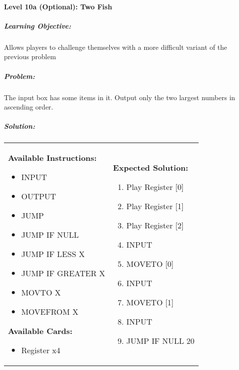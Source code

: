 \paragraph{Level 10a (Optional): Two Fish}
\subparagraph{Learning Objective:} Allows players to challenge themselves with a more difficult variant of the previous problem

\subparagraph{Problem:} The input box has some items in it. Output only the two largest numbers in ascending order.

\subparagraph{Solution:} 
\begin{center}
    \begin{tabular}{ | m{5cm} | m{9cm} | } 
        \hline
            \textbf{Available Instructions:} 
            \begin{itemize}
                \setlength\itemsep{-.35em}
                \item INPUT
                \item OUTPUT
                \item JUMP
                \item JUMP IF NULL
                \item JUMP IF LESS X
                \item JUMP IF GREATER X
                \item MOVTO X
                \item MOVEFROM X
            \end{itemize}
            \textbf{Available Cards:} 
            \begin{itemize}
                \setlength\itemsep{-.35em}
                \item Register x4
            \end{itemize}& 
            \textbf{Expected Solution:} 
            \begin{enumerate}
                \setlength\itemsep{-.35em}
                \item Play Register [0]
                \item Play Register [1]
                \item Play Register [2]
                \item INPUT
                \item MOVETO [0]
                \item INPUT
                \item MOVETO [1]
                \item INPUT
                \item JUMP IF NULL 20

\end{enumerate}
\end{tabular}
\end{center}
